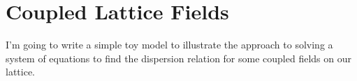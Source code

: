 \documentclass[12pt]{article}
\begin{document}
\newcommand{\pder}[2]{\frac{\partial {#1}}{\partial {#2}}}
\newcommand{\pdert}[2]{\frac{\partial^2 {#1}}{\partial {#2}^2}}
\newcommand{\fder}[2]{\frac{\delta {#1}}{\delta {#2}}}
\newcommand{\PDD}[3]{\left.\frac{\partial^{2}{#1}}{\partial{#2}^{2}}\right|_{#3}
}
\newcommand{\PD}[3]{\left.\frac{\partial{#1}}{\partial{#2}}\right|_{#3}}
\newcommand{\der}[2]{\frac{d {#1}}{d {#2}}}
\newcommand{\pdder}[3]{\frac{\del^2 {#1}}{\del {#2} \del {#3}}}


\renewcommand{\deg}{^\circ}
\newcommand{\com}{{\bf [C] }}
\newcommand{\cend}{\Emark\[\]\vspace*{-1. cm}}
\newcommand{\x}{\times}

\newcommand{\win}{\ddot\smile}
\newcommand{\lose}{\ddot\frown}
\newcommand{\avg}[1]{\left \langle #1 \right \rangle}
\newcommand{\E}[1]{\ensuremath{\times10^{#1}}}
\newcommand{\abs}[1]{\ensuremath{\left | #1 \right |}}
\newcommand{\paren}[1]{\left(#1\right)}
\newcommand{\recip}[1]{\frac{1}{#1}}
\newcommand{\ex}[1]{\mathbb{E}[#1]}
\newcommand{\bprob}[1]{\textbf{#1~---}}
\newcommand{\unitv}[1]{\ensuremath{\mathbf{\hat{e}}_{#1}}}
\newcommand{\goto}{\rightarrow}
\newcommand{\expct}[1]{\mathbb{E}[#1]}
\newcommand{\mtrx}[1]{\begin{matrix}#1\end{matrix}}
\newcommand{\pmtrx}[1]{\paren{\begin{matrix}#1\end{matrix}}}
\newcommand{\cosp}[1]{\cos{\paren{#1}}}
\newcommand{\sinp}[1]{\sin{\paren{#1}}}
\newcommand{\tanp}[1]{\tan{\paren{#1}}}
\newcommand{\half}[1]{\frac{#1}{2}}
\newcommand{\ham}{\mathcal{H}}
\newcommand{\tr}{\mathrm{Tr}}
\newcommand{\bv}[1]{\mathbf{#1}}
\newcommand{\Der}[2]{\frac{d#1}{d#2}}
\renewcommand{\Dot}[2]{\ensuremath{\bv{#1}\cdot\bv{#2}}}
\newcommand{\Cross}[2]{\ensuremath{\bv{#1}\times\bv{#2}}}
\newcommand{\del}{\ensuremath{\partial}}
\newcommand{\R}{\ensuremath{\bv{r-r'}}}
\newcommand{\aR}{\ensuremath{\abs{\R}}}
\newcommand{\br}{\ensuremath{\bv{r}}}
\newcommand{\impl}{\ensuremath{\quad \Rightarrow \quad}}
\renewcommand{\div}[1]{\nabla \cdot \bv{#1}}
\newcommand{\curl}[1]{\nabla \times \bv{#1}}
\newcommand{\lapl}{\nabla^2}
\newcommand{\vint}{\int d^3r}
\newcommand{\oocs}{\recip{c^2}}
\newcommand{\mnfp}[1]{\frac{\mu_0 #1}{4\pi}}
\renewcommand{\iiint}{\int_{-\infty}^{\infty}}
\newcommand{\tpi}[1]{\paren{2\pi}^{#1}}
\newcommand{\ootpi}[1]{\recip{\paren{2\pi}^{#1}}}


\section{Coupled Lattice Fields}
I'm going to write a simple toy model to illustrate the approach to solving a system of equations to find the dispersion relation for some coupled fields on our lattice.
\end{document}
